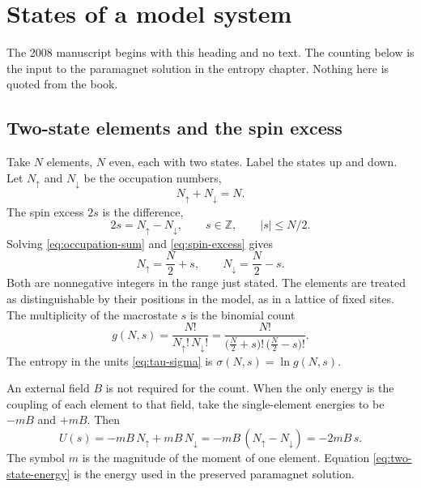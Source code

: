 \section{States of a model system}
\label{sec:model-system}

The 2008 manuscript begins with this heading and no text. The counting below is the input to the paramagnet solution in the entropy chapter. Nothing here is quoted from the book.

\subsection{Two-state elements and the spin excess}

Take \(N\) elements, \(N\) even, each with two states. Label the states up and down. Let \(N_{\uparrow}\) and \(N_{\downarrow}\) be the occupation numbers,
\begin{equation}
\label{eq:occupation-sum}
N_{\uparrow} + N_{\downarrow} = N.
\end{equation}
The spin excess \(2s\) is the difference,
\begin{equation}
\label{eq:spin-excess}
2s = N_{\uparrow} - N_{\downarrow},
\qquad
s \in \mathbb{Z},
\qquad
|s| \le N/2.
\end{equation}
Solving \eqref{eq:occupation-sum} and \eqref{eq:spin-excess} gives
\begin{equation}
\label{eq:occupations}
N_{\uparrow} = \frac{N}{2} + s,
\qquad
N_{\downarrow} = \frac{N}{2} - s.
\end{equation}
Both are nonnegative integers in the range just stated. The elements are treated as distinguishable by their positions in the model, as in a lattice of fixed sites. The multiplicity of the macrostate \(s\) is the binomial count
\begin{equation}
\label{eq:multiplicity}
g(N,s) = \frac{N!}{N_{\uparrow}!\, N_{\downarrow}!}
= \frac{N!}{\bigl(\tfrac{N}{2}+s\bigr)!\, \bigl(\tfrac{N}{2}-s\bigr)!}.
\end{equation}
The entropy in the units \eqref{eq:tau-sigma} is \(\sigma(N,s) = \ln g(N,s)\).

An external field \(B\) is not required for the count. When the only energy is the coupling of each element to that field, take the single-element energies to be \(-mB\) and \(+mB\). Then
\begin{equation}
\label{eq:two-state-energy}
U(s) = -mB\, N_{\uparrow} + mB\, N_{\downarrow} = -mB\,(N_{\uparrow}-N_{\downarrow}) = -2mB\, s.
\end{equation}
The symbol \(m\) is the magnitude of the moment of one element. Equation \eqref{eq:two-state-energy} is the energy used in the preserved paramagnet solution.

